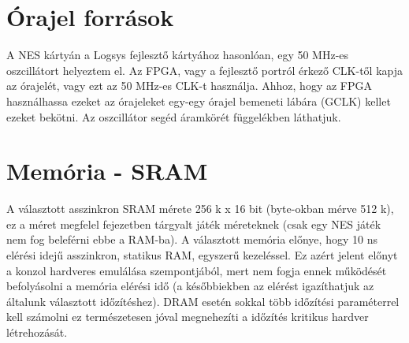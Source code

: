 \section{Órajel források}
	
	A NES kártyán a Logsys fejlesztő kártyához hasonlóan, egy 50 MHz-es oszcillátort helyeztem el. Az FPGA, vagy a fejlesztő portról érkező CLK-től kapja az órajelét, vagy ezt az 50 MHz-es CLK-t használja. Ahhoz, hogy az FPGA használhassa ezeket az órajeleket egy-egy órajel bemeneti lábára (GCLK) kellet ezeket bekötni. Az oszcillátor segéd áramkörét  függelékben láthatjuk. %
	
	
\section{Memória - SRAM}
	
	A választott asszinkron SRAM mérete 256 k x 16 bit (byte-okban mérve 512 k), ez a méret megfelel  fejezetben tárgyalt játék méreteknek (csak egy NES játék nem fog beleférni ebbe a RAM-ba). A választott memória előnye, hogy 10 ns elérési idejű asszinkron, statikus RAM, egyszerű kezeléssel. Ez azért jelent előnyt a konzol hardveres emulálása szempontjából, mert nem fogja ennek működését befolyásolni a memória elérési idő (a későbbiekben az elérést igazíthatjuk az általunk választott időzítéshez). DRAM esetén sokkal több időzítési paraméterrel kell számolni ez természetesen jóval megnehezíti a időzítés kritikus hardver létrehozását.
	
